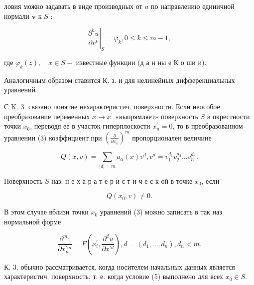 \documentclass[10pt]{article}
\begin{document}
ловия можно задавать в виде производных от $u$ по направлению единичной нормали $\boldsymbol{v}$ к $S$ :



\[

\left.\frac{\partial^{k} u}{\partial v^{k}}\right|_{S}=\varphi_{k}, 0 \leqslant k \leqslant m-1,

\]



где $\varphi_{k}(z), \quad x \in S-$ известные функции (д а н ны е К о ши и).



Аналогичным образом ставится К. з. и для нелинейных дифференциальных уравнений.



С K. 3. связано понятие нехарактеристич. поверхности. Если неособое преобразование переменных $x \rightarrow x^{\prime}$ «выпрямляет» поверхность $S$ в окрестности точки $x_{0}$, переводя ее в участок гиперплоскости $x_{n}^{\prime}=0$, то в преобразованном уравнении (3) коэффициент при $\left(\frac{\partial}{\partial x_{n}^{\prime}}\right)^{m}$ пропорционален величине



\[

Q(x, v)=\sum_{|d|=m} a_{\alpha}(x) v^{d}, v^{d}=v_{1}^{d_{1}} v_{2}^{d_{2}} \ldots v_{n}^{d_{n}} .

\]



Поверхность $S$ наз. н е х а р а т е р и с т и ч е с к ой в точке $x_{0}$, если



\[

Q\left(x_{0}, v\right) \neq 0 .

\]



В этом случае вблизи точки $x_{0}$ уравнений (3) можно записать в так наз. нормальной форме



\[

\frac{\partial^{m_{u}}}{\partial x_{n}^{\prime m}}=F\left(x_{i}^{\prime}, \frac{\partial^{d} u}{\partial x^{\prime d}}\right), d=\left(d_{1}, \ldots, d_{n}\right), d_{n}<m .

\]



К. 3. обычно рассматривается, когда носителем начальных данных является характеристич. поверхность, т. е. когда условие (5) выполнено для всех $x_{0} \in S$.
\end{document}
